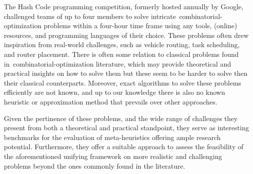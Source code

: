 The Hash Code programming competition, formerly hosted annually by Google,
challenged teams of up to four members to solve
intricate~\acrshort{combinatorial-optimization} problems within a four-hour time
frame using any tools, (online) resources, and programming languages of their
choice. These problems often drew inspiration from real-world challenges, such
as vehicle routing, task scheduling, and router placement. There is often some
relation to classical problems found in~\acrshort{combinatorial-optimization}
literature, which may provide theoretical and practical insights on how to solve
them but these seem to be harder to solve then their classical counterparts.
Moreover, exact algorithms to solve these problems efficiently are not known,
and up to our knowledge there is also no known heuristic or approximation method
that prevails over other approaches.

Given the pertinence of these problems, and the wide range of challenges they
present from both a theoretical and practical standpoint, they serve as
interesting benchmarks for the evaluation of meta-heuristics offering ample
research potential. Furthermore, they offer a suitable approach to assess the
feasibility of the aforementioned unifying framework on more realistic and
challenging problems beyond the ones commonly found in the literature.